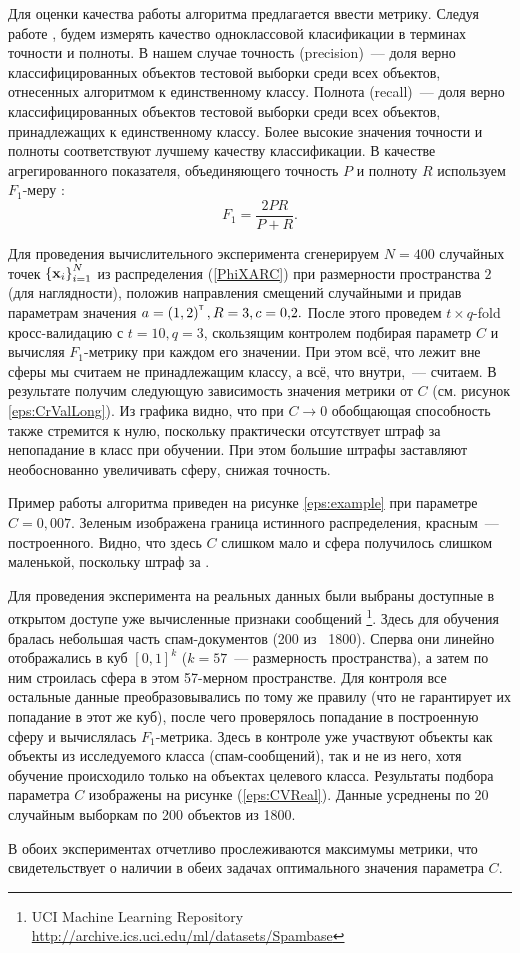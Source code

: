 Для оценки качества работы алгоритма предлагается ввести метрику. 
Следуя работе  \cite{Romanenko2012}, будем измерять качество одноклассовой класификации в терминах точности и полноты. 
В нашем случае точность (precision)~--- доля верно классифицированных объектов тестовой выборки среди всех объектов, отнесенных алгоритмом к единственному классу. 
Полнота (recall)~--- доля верно классифицированных объектов тестовой выборки среди всех объектов, принадлежащих к единственному классу. 
Более высокие значения точности и полноты соответствуют лучшему качеству классификации. 
В качестве агрегированного показателя, объединяющего точность $P$ и полноту $R$ используем $F_1$-меру \cite{Rijsbergen1979}:
$$F_1 = \frac{2PR}{P+R}.$$

Для проведения вычислительного эксперимента сгенерируем $N=400$ случайных точек $\left\{\boldsymbol{\mathbf{x}}_i\right\}_{i=1}^N$ из распределения (\ref{PhiXARC}) при размерности пространства $2$ (для наглядности), положив направления смещений случайными и придав параметрам значения $a = \left(1,2\right)^{\text{\tiny\sffamily\upshape\mdseries T}}, R = 3, c = 0{,}2.$
После этого проведем $t{\times}q$-fold кросс-валидацию с $t = 10, q = 3$, скользящим контролем подбирая параметр $C$ и вычисляя $F_1$-метрику при каждом его значении. При этом всё, что лежит вне сферы мы считаем не принадлежащим классу, а всё, что внутри,~--- считаем.
В результате получим следующую зависимость значения метрики от $C$ (см. рисунок \ref{eps:CrValLong}).
Из графика видно, что при $C\to 0$ обобщающая способность также стремится к нулю, поскольку практически отсутствует штраф за непопадание в класс при обучении. 
При этом большие штрафы заставляют необоснованно увеличивать сферу, снижая точность.

Пример работы алгоритма приведен на рисунке \ref{eps:example} при параметре $C = 0{,}007.$ 
Зеленым изображена граница истинного распределения, красным~--- построенного.
Видно, что здесь $C$ слишком мало и сфера получилось слишком маленькой, поскольку штраф за .



Для проведения эксперимента на реальных данных были выбраны доступные в открытом доступе уже вычисленные признаки сообщений \footnote{UCI Machine Learning Repository \href{http://archive.ics.uci.edu/ml/datasets/Spambase}{http://archive.ics.uci.edu/ml/datasets/Spambase}}. 
Здесь для обучения бралась небольшая часть спам-документов (200 из ~1800). 
Сперва они линейно отображались в куб $[0, 1]^k$ ($k = 57$~--- размерность пространства), а затем по ним строилась сфера в этом 57-мерном пространстве. 
Для контроля все остальные данные преобразовывались по тому же правилу (что не гарантирует их попадание в этот же куб), после чего проверялось попадание в построенную сферу и вычислялась $F_1$-метрика. 
Здесь в контроле уже участвуют объекты как объекты из исследуемого класса (спам-сообщений), так и не из него, хотя обучение происходило только на объектах целевого класса. 
Результаты подбора параметра $C$ изображены на рисунке (\ref{eps:CVReal}). Данные усреднены по 20 случайным выборкам по 200 объектов из 1800.



В обоих экспериментах отчетливо прослеживаются максимумы метрики, что свидетельствует о наличии в обеих задачах оптимального значения параметра $C.$
